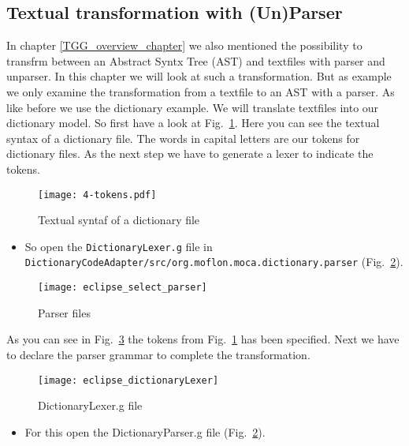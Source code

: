 \subsection{Textual transformation with (Un)Parser}
In chapter \ref{TGG_overview_chapter} we also mentioned the possibility to transfrm between an Abstract Syntx Tree (AST) and textfiles with parser and unparser. In this chapter we will look at such a transformation. But as example we only examine the transformation from a textfile to an AST with a parser.
\newline
\newline
As like before we use the dictionary example. We will translate textfiles into our dictionary model. So first have a look at Fig.~\ref{textual_syntax}. Here you can see the textual syntax of a dictionary file. The words in capital letters are our tokens for dictionary files.
\newline
As the next step we have to generate a lexer to indicate the tokens.

\begin{figure}[htbp]
	\centering
	\texttt{[image: 4-tokens.pdf]}
	\caption{Textual syntaf of a dictionary file} 
	\label{textual_syntax} 
\end{figure} 

\begin{itemize}
\item So open the \texttt{DictionaryLexer.g} file in \texttt{Dictionary\-Code\-Adap\-ter/\-src/\-org.\-moflon.\-moca.\-dictionary.\-parser} (Fig.~\ref{ParserFiles}).
\end{itemize}

\begin{figure}[htbp]
	\centering
	\texttt{[image: eclipse\_select\_parser]}
	\caption{Parser files} 
	\label{ParserFiles} 
\end{figure} 

As you can see in Fig.~\ref{DictionaryLexer} the tokens from Fig.~\ref{textual_syntax} has been specified.
\newline
Next we have to declare the parser grammar to complete the transformation.

\begin{figure}[htbp]
	\centering
	\texttt{[image: eclipse\_dictionaryLexer]}
	\caption{DictionaryLexer.g file} 
	\label{DictionaryLexer} 
\end{figure} 

\begin{itemize}
\item For this open the DictionaryParser.g file (Fig.~\ref{ParserFiles}). 
\end{itemize}

